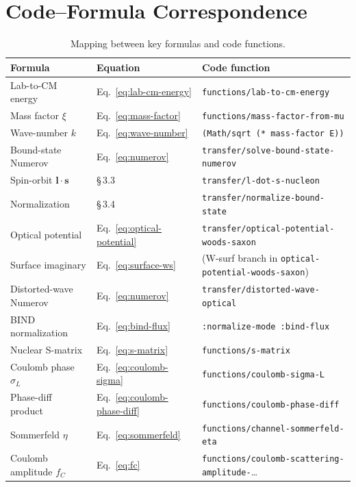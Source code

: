 \documentclass[12pt,a4paper]{article}
\begin{document}
\section{Code--Formula Correspondence}

\begin{table}[h]
\centering
\caption{Mapping between key formulas and code functions.}
\label{tab:code-map}
\begin{tabular}{lll}
\toprule
Formula & Equation & Code function \\
\midrule
Lab-to-CM energy & Eq.~\eqref{eq:lab-cm-energy}
  & \texttt{functions/lab-to-cm-energy} \\
Mass factor $\xi$ & Eq.~\eqref{eq:mass-factor}
  & \texttt{functions/mass-factor-from-mu} \\
Wave-number $k$ & Eq.~\eqref{eq:wave-number}
  & \texttt{(Math/sqrt (* mass-factor E))} \\
Bound-state Numerov & Eq.~\eqref{eq:numerov}
  & \texttt{transfer/solve-bound-state-numerov} \\
Spin-orbit $\bm{l}\cdot\bm{s}$ & \S\,3.3
  & \texttt{transfer/l-dot-s-nucleon} \\
Normalization & \S\,3.4
  & \texttt{transfer/normalize-bound-state} \\
Optical potential & Eq.~\eqref{eq:optical-potential}
  & \texttt{transfer/optical-potential-woods-saxon} \\
Surface imaginary & Eq.~\eqref{eq:surface-ws}
  & (W-surf branch in \texttt{optical-potential-woods-saxon}) \\
Distorted-wave Numerov & Eq.~\eqref{eq:numerov}
  & \texttt{transfer/distorted-wave-optical} \\
BIND normalization & Eq.~\eqref{eq:bind-flux}
  & \texttt{:normalize-mode :bind-flux} \\
Nuclear S-matrix & Eq.~\eqref{eq:s-matrix}
  & \texttt{functions/s-matrix} \\
Coulomb phase $\sigma_L$ & Eq.~\eqref{eq:coulomb-sigma}
  & \texttt{functions/coulomb-sigma-L} \\
Phase-diff product & Eq.~\eqref{eq:coulomb-phase-diff}
  & \texttt{functions/coulomb-phase-diff} \\
Sommerfeld $\eta$ & Eq.~\eqref{eq:sommerfeld}
  & \texttt{functions/channel-sommerfeld-eta} \\
Coulomb amplitude $f_C$ & Eq.~\eqref{eq:fc}
  & \texttt{functions/coulomb-scattering-amplitude-}\ldots \\

\end{tabular}
\end{table}
\end{document}
